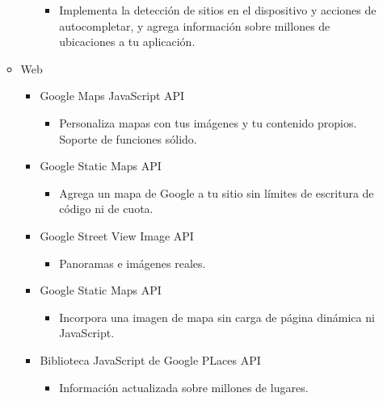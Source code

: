 \documentclass[a4paper, 11pt]{article}
\begin{document}
\begin{itemize}
\begin{itemize}
\begin{itemize}
                    \begin{itemize}
                        \item{Implementa la detección de sitios en el
                              dispositivo y acciones de autocompletar, y agrega
                              información sobre millones de ubicaciones a tu
                              aplicación.}
                    \end{itemize}
              \end{itemize}
              \item{Web}
                \begin{itemize}
                    \item{Google Maps JavaScript API}
                      \begin{itemize}
                          \item{Personaliza mapas con tus imágenes y tu
                                contenido propios. Soporte de funciones sólido.}
                      \end{itemize}
                    \item{Google Static Maps API}
                      \begin{itemize}
                          \item{Agrega un mapa de Google a tu sitio sin límites
                                de escritura de código ni de cuota.}
                      \end{itemize}
                    \item{Google Street View Image API}
                      \begin{itemize}
                          \item{Panoramas e imágenes reales.}
                      \end{itemize}
                    \item{Google Static Maps API}
                      \begin{itemize}
                          \item{Incorpora una imagen de mapa sin carga de página
                                dinámica ni JavaScript.}
                      \end{itemize}
                    \item{Biblioteca JavaScript de Google PLaces API}
                      \begin{itemize}
                          \item{Información actualizada sobre millones de
                                lugares.}
                      \end{itemize}


\end{itemize}
\end{itemize}
\end{itemize}
\end{document}
